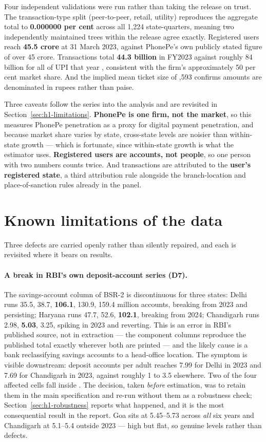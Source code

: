 Four independent validations were run rather than taking the release on trust. The transaction-type
split (peer-to-peer, retail, utility) reproduces the aggregate total to \textbf{0.000000 per cent}
across all 1,224 state-quarters, meaning two independently maintained trees within the release
agree exactly. Registered users reach \textbf{45.5 crore} at 31 March 2023, against PhonePe's own
publicly stated figure of over 45 crore. Transactions total \textbf{44.3 billion} in FY2023 against
roughly 84 billion for all of UPI that year \citep{npci2025}, consistent with the firm's
approximately 50 per cent market share. And the implied mean ticket size of ,593 confirms
amounts are denominated in rupees rather than paise.

Three caveats follow the series into the analysis and are revisited in
Section~\ref{sec:h1-limitations}. \textbf{PhonePe is one firm, not the market}, so this measures
PhonePe penetration as a proxy for digital payment penetration, and because market share varies by
state, cross-state levels are noisier than within-state growth --- which is fortunate, since
within-state growth is what the estimator uses. \textbf{Registered users are accounts, not people},
so one person with two numbers counts twice. And transactions are attributed to the \textbf{user's
registered state}, a third attribution rule alongside the branch-location and place-of-sanction
rules already in the panel.

\section{Known limitations of the data}
\label{sec:data-defects}

Three defects are carried openly rather than silently repaired, and each is revisited where it
bears on results.

\paragraph{A break in RBI's own deposit-account series (D7).} The savings-account column of BSR-2
is discontinuous for three states: Delhi runs 35.5, 38.7, \textbf{106.1}, 130.9, 159.4 million
accounts, breaking from 2023 and persisting; Haryana runs 47.7, 52.6, \textbf{102.1}, breaking from
2024; Chandigarh runs 2.98, \textbf{5.03}, 3.25, spiking in 2023 and reverting. This is an error in
RBI's published source, not in extraction --- the component columns reproduce the published total
exactly wherever both are printed --- and the likely cause is a bank reclassifying savings accounts
to a head-office location. The symptom is visible downstream: deposit accounts per adult reaches
7.99 for Delhi in 2023 and 7.69 for Chandigarh in 2023, against roughly 1 to 3.5 elsewhere. Two of
the four affected cells fall inside \panelA{}. The decision, taken \emph{before} estimation, was to
retain them in the main specification and re-run without them as a robustness check;
Section~\ref{sec:h1-robustness} reports what happened, and it is the most consequential result in
the report. Goa sits at 5.45--5.73 across \emph{all} six years and Chandigarh at 5.1--5.4 outside
2023 --- high but flat, so genuine levels rather than defects.

